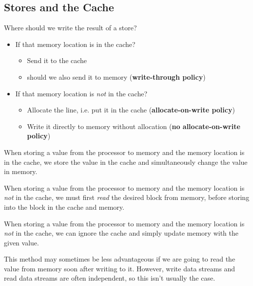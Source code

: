 \subsection{Stores and the Cache}
Where should we write the result of a store?
\begin{itemize}
  \item If that memory location is in the cache?
    \begin{itemize}
      \item Send it to the cache
      \item should we also send it to memory (\textbf{write-through policy})
    \end{itemize}
  \item If that memory location is \emph{not} in the cache?
    \begin{itemize}
      \item Allocate the line, i.e. put it in the cache (\textbf{allocate-on-write policy})
      \item Write it directly to memory without allocation (\textbf{no allocate-on-write policy})
    \end{itemize}
\end{itemize}


\begin{definition}
  When storing a value from the processor to memory and the memory location is in the cache, we store the value in the cache and simultaneously change the value in memory.
\end{definition}

\begin{definition}
  When storing a value from the processor to memory and the memory location is \emph{not} in the cache, we must first \emph{read} the desired block from memory, before storing into the block in the cache and memory.
\end{definition}

\begin{definition}
  When storing a value from the processor to memory and the memory location is \emph{not} in the cache, we can ignore the cache and simply update memory with the given value.
\end{definition}
\begin{remark}
  This method may sometimes be less advantageous if we are going to read the value from memory soon after writing to it. However, write data streams and read data streams are often independent, so this isn't usually the case.
\end{remark}